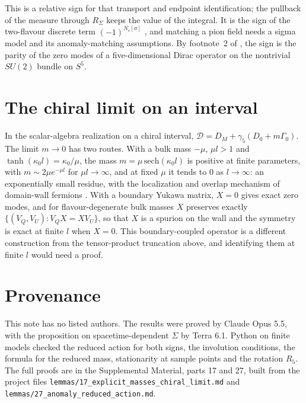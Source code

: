 \documentclass[aps,prd,reprint,onecolumn,nofootinbib,amsmath,amssymb,floatfix]{revtex4-2}
\theoremstyle{plain}
\begin{document}
This is a relative sign for that transport and endpoint identification; the pullback of the measure through $R_\Sigma$ keeps the value of the integral. It is the sign of the two-flavour discrete term $(-1)^{N_c[\sigma]}$ \cite{LOT2021}, and matching a pion field needs a sigma model and its anomaly-matching assumptions. By footnote~2 of \cite{Witten1982}, the sign is the parity of the zero modes of a five-dimensional Dirac operator on the nontrivial $SU(2)$ bundle on $S^5$.

\section{The chiral limit on an interval}

In the scalar-algebra realization on a chiral interval, $\mathcal D=D_M+\gamma_5(D_0+m\Gamma_0)$. The limit $m\to0$ has two routes. With a bulk mass $-\mu$, $\mu l>1$ and $\tanh(\kappa_0l)=\kappa_0/\mu$, the mass $m=\mu\,\mathrm{sech}(\kappa_0l)$ is positive at finite parameters, with $m\sim2\mu e^{-\mu l}$ for $\mu l\to\infty$, and at fixed $\mu$ it tends to $0$ as $l\to\infty$: an exponentially small residue, with the localization and overlap mechanism of domain-wall fermions \cite{Kaplan1992,Shamir1993}. With a boundary Yukawa matrix, $X=0$ gives exact zero modes, and for flavour-degenerate bulk masses $X$ preserves exactly $\{(V_Q,V_U):V_QX=XV_U\}$, so that $X$ is a spurion on the wall and the symmetry is exact at finite $l$ when $X=0$. This boundary-coupled operator is a different construction from the tensor-product truncation above, and identifying them at finite $l$ would need a proof.

\section*{Provenance}

This note has no listed authors. The results were proved by Claude Opus 5.5, with the proposition on spacetime-dependent $\Sigma$ by Terra 6.1. Python on finite models checked the reduced action for both signs, the involution conditions, the formula for the reduced mass, stationarity at sample points and the rotation $R_5$. The full proofs are in the Supplemental Material, parts 17 and 27, built from the project files \texttt{lemmas/17\_explicit\_\allowbreak masses\_chiral\_limit.md} and \texttt{lemmas/27\_anomaly\_\allowbreak reduced\_action.md}.


\end{document}
